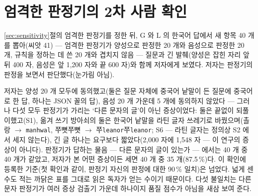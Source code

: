 \documentclass[11pt]{article}
\begin{document}
\section{엄격한 판정기의 2차 사람 확인}\label{app:human2}

\ref{sec:sensitivity}절의 엄격한 판정기를 정한 뒤, G 와 L 의 한국어 답에서 새 항목 40 개를 뽑아(씨앗 41) --- 엄격한 판정기가
양성으로 판정한 20 개와 음성으로 판정한 20 개, 규칙을 정하는 데 쓴 20 개와 겹치지 않음 --- 질문과 긴 발췌(양성은 잡힌 자리 앞뒤 400
자, 음성은 앞 1,200 자와 끝 600 자)와 함께 저자에게 보였다. 저자는 판정기의 판정을 보면서 판단했다(눈가림 아님).

저자는 양성 20 개 모두에 동의했고(둘은 질문 자체에 중국어 낱말이 든 질문에 중국어로 한 답, 하나는 JSON 꼴의 답), 음성 20 개 가운데
5 개에 동의하지 않았다 --- 그러나 다섯 모두 판정기가 가리는 `다른 문자의 글'이 아닌 증상이었다: 둘은 끝없이 되풀이했고(S1), 옮겨
쓰기 방아쇠의 둘은 한국어 낱말을 라틴 글자 쓰레기로 바꿨으며(촐랑 $\to$ \texttt{manhwal}, 쭈뼛쭈뼛 $\to$
쭈\texttt{leanor}쭈\texttt{leanor}; S6 --- 라틴 글자는 정의상 S2 에서 세지 않는다), 긴 글 하나는 요구보다 짧았다(2,000 자에 1,548
자 --- 이 연구의 증상이 아니다). 판정기가 답하는 물음 --- 다른 문자의 글이 있는가 --- 에서는 40 개 중 40 개가 같았고, 저자가 본 어떤
증상이든 세면 40 개 중 35 개(87.5\,\%)다. 이 확인에 등록한 기준(첫 확인과 같이, 판정기 자신의 판정에 대한 90\,\% 일치)은 넘었다.
넓게 센 수도 적는 까닭은 표를 그대로 읽은 독자가 얻는 수이기 때문이다. 다섯 불일치는 다른 문자 판정기가 여러 증상 검출기 가운데
하나이지 품질 점수가 아님을 새삼 보여 준다.
\end{document}
